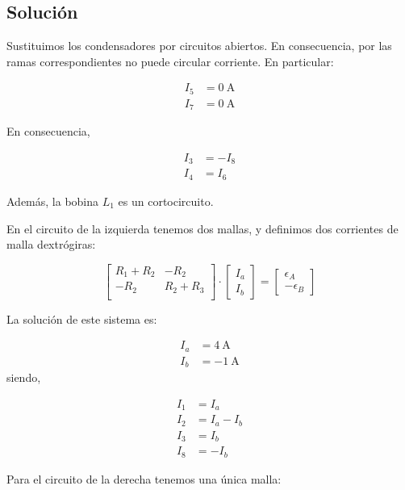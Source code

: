 \documentclass[10pt]{article}
\begin{document}
\subsection*{Solución}

Sustituimos los condensadores por circuitos abiertos. En consecuencia, por las ramas correspondientes no puede circular corriente. En particular:

\begin{align*}
  I_5 &= \SI{0}{\ampere}\\
  I_7 &= \SI{0}{\ampere}
\end{align*}

En consecuencia,

\begin{align*}
  I_3 &= -I_8\\
  I_4 &= I_6
\end{align*}

Además, la bobina $L_1$ es un cortocircuito.

En el circuito de la izquierda tenemos dos mallas, y definimos dos corrientes de malla dextrógiras:

\begin{equation*}
  \begin{bmatrix}
    R_1 + R_2 & -R_2\\
    -R_2 & R_2 + R_3\\
  \end{bmatrix} \cdot %
  \begin{bmatrix}
    I_a\\
    I_b
  \end{bmatrix} = %
  \begin{bmatrix}
    \epsilon_A\\
    -\epsilon_B
  \end{bmatrix}
\end{equation*}

La solución de este sistema es:

\begin{align*}
  I_a &= \SI{4}{\ampere}\\
  I_b &= \SI{-1}{\ampere}
\end{align*}
siendo,

\begin{align*}
  I_1 &= I_a\\
  I_2 &= I_a - I_b\\
  I_3 &= I_b\\
  I_8 &= -I_b
\end{align*}

Para el circuito de la derecha tenemos una única malla:
\end{document}
